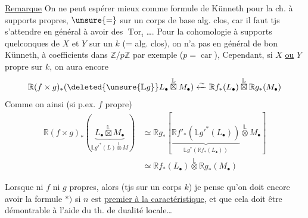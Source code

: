 \uline{Remarque} On ne peut espérer mieux comme
formule de Künneth pour la ch. à supports
propres, $\unsure{=}$ sur un corps de base alg. clos, car
il faut tjs s'attendre en général à avoir des
$\operatorname{Tor}_i$\ldots. Pour la cohomologie à supports quelconques
de $X$ et $Y$  sur un $k$ (= alg. clos), on n'a pas
en général de bon Künneth, à coefficients dans
$\mathbb Z/p\mathbb Z$ par exemple ($p=\operatorname{car}$), 
Cependant, si $X$ \uline{ou}
\uline{$Y$} propre sur $k$, on aura encore
\margin{\textcircled{*}}
\[
\mathbb R(f\times g)_*(\deleted{\unsure{\mathbb Lg}}L_\bullet\overset{\mathbb L}{\boxtimes}M_\bullet)
\xleftarrow{\sim}\mathbb Rf_*(L_\bullet)\overset{\mathbb L}{\boxtimes}\mathbb Rg_*(M_\bullet)
\]
Comme on  ainsi (si p.ex. $f$ propre)
\[
\begin{aligned}
\mathbb R(f\times g)_*(\underbrace{L_\bullet\overset{\mathbb L}{\boxtimes}M_\bullet}_{\mathbb Lg'^*(L)\overset{\mathbb L}{\otimes}M})
&\simeq\mathbb Rg_*[\underbrace{\mathbb Rf'_*(\mathbb Lg'^*(L_\bullet))}_{\mathbb Lg^*(\mathbb Rf_*(L_\bullet))}\overset{\mathbb L}{\otimes}M_\bullet]\\
&\simeq\mathbb Rf_*(L_\bullet)\overset{\mathbb L}{\otimes}\mathbb Rg_*(M_\bullet)
\end{aligned}
\]

Lorsque ni $f$ ni $g$ propres, alors  (tjs sur
un corps $k$) je pense qu'on doit encore avoir
la formule  $*)$ si $n$ est \uline{premier à la caractéristique},
et que cela doit être démontrable à l'aide du
th. de dualité locale\ldots
{}
